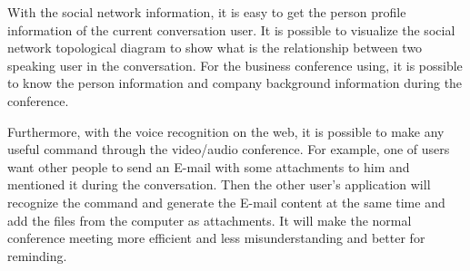 \par With the social network information, it is easy to get the person profile information of the current conversation user. It is possible to visualize the social network topological diagram to show what is the relationship between two speaking user in the conversation. For the business conference using, it is possible to know the person information and company background information during the conference.

\par Furthermore, with the voice recognition on the web, it is possible to make any useful command through the video/audio conference. For example, one of users want other people to send an E-mail with some attachments to him and mentioned it during the conversation. Then the other user's application will recognize the command and generate the E-mail content at the same time and add the files from the computer as attachments. It will make the normal conference meeting more efficient and less misunderstanding and better for reminding.

